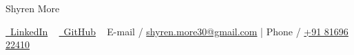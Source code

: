 \documentclass[a4,10pt]{article}
\begin{document}

\begin{flushleft}

    \begin{minipage}[b]{0.5\textwidth}
    {\Huge Shyren More} \\ 
    \end{minipage}%

    \faLinkedin \href{https://linkedin.com/in/shyrenmore/}{\raisebox{-0.2\height}\ LinkedIn} ~ 
    \faGithub \href{https://github.com/ShyrenMore}
    {\raisebox{-0.2\height}\ GitHub}  ~ 
    E-mail / \href{mailto:shyren.more30@gmail.com}{shyren.more30@gmail.com} | Phone / \href{tel:8169622410}{+91 81696 22410}

    
\end{flushleft}
             
             
    
\end{document}
